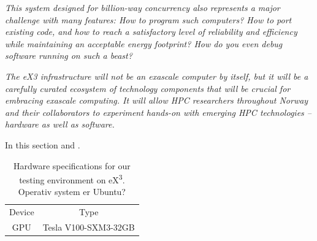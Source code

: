 \textit{This system designed for billion-way concurrency also represents a major challenge with many features: How to program such computers? How to port existing code, and how to reach a satisfactory level of reliability and efficiency while maintaining an acceptable energy footprint? How do you even debug software running on such a beast? }


\textit{The eX3 infrastructure will not be an exascale computer by itself, but it will be a carefully curated ecosystem of technology components that will be crucial for embracing exascale computing. It will allow HPC researchers throughout Norway and their collaborators to experiment hands-on with emerging HPC technologies – hardware as well as software.}

In this section \cite{ex3docs} and \cite{ex3homepage}.

\begin{table}[ht]
    \centering
    \begin{tabular}{c|c}
        Device &  Type  \\
        GPU & Tesla V100-SXM3-32GB 
    \end{tabular}
    \caption{Hardware specifications for our testing environment on eX\textsuperscript{3}. Operativ system er Ubuntu?}
    \label{tab:hardware_ex3}
\end{table}

